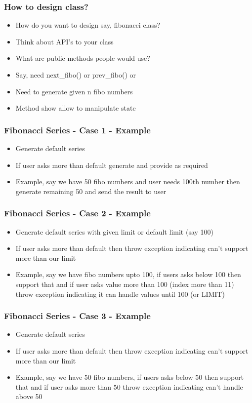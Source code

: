 \documentclass[14pt]{beamer}
\begin{document}
    \begin{frame}[containsverbatim]
        \frametitle{How to design class?}
        \begin{itemize}
        \item How do you want to design say, fibonacci class?
        \item Think about API's to your class
        \item What are public methods people would use?
        \item Say, need next\_fibo() or prev\_fibo() or
        \item Need to generate given n fibo numbers
        \item Method show allow to manipulate state
        \end{itemize}
    \end{frame}

    \begin{frame}[containsverbatim]
        \frametitle{Fibonacci Series - Case 1 - Example}
        \begin{itemize}
        \item Generate default series
        \item If user asks more than default generate and provide as required 
        \item Example, say we have 50 fibo numbers and user needs 100th number then generate remaining 50 and send the result to user 
        \end{itemize}
    \end{frame}

    \begin{frame}[containsverbatim]
        \frametitle{Fibonacci Series - Case 2 - Example}
        \begin{itemize}
        \item Generate default series with given limit or default limit (say 100)
        \item If user asks more than default then throw exception indicating can't support more than our limit
        \item Example, say we have fibo numbers upto 100, if users asks below 100 then support that and if user asks value more than 100 (index more than 11) throw exception indicating it can handle values until 100 (or LIMIT)        
        \end{itemize}
    \end{frame}

    \begin{frame}[containsverbatim]
        \frametitle{Fibonacci Series - Case 3 - Example}
        \begin{itemize}
        \item Generate default series
        \item If user asks more than default then throw exception indicating can't support more than our limit
        \item Example, say we have 50 fibo numbers, if users asks below 50 then support that and if user asks more than 50 throw exception indicating can't handle above 50        
        \end{itemize}
    \end{frame}
\end{document}
